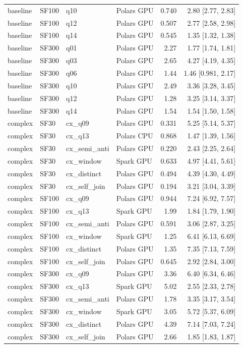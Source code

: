 \begin{longtable}{llllrr}
baseline & SF100 & q10 & Polars GPU & 0.740 & 2.80 [2.77, 2.83] \\
baseline & SF100 & q12 & Polars GPU & 0.507 & 2.77 [2.58, 2.98] \\
baseline & SF100 & q14 & Polars GPU & 0.545 & 1.35 [1.32, 1.38] \\
baseline & SF300 & q01 & Polars GPU & 2.27 & 1.77 [1.74, 1.81] \\
baseline & SF300 & q03 & Polars GPU & 2.65 & 4.27 [4.19, 4.35] \\
baseline & SF300 & q06 & Polars GPU & 1.44 & 1.46 [0.981, 2.17] \\
baseline & SF300 & q10 & Polars GPU & 2.49 & 3.36 [3.28, 3.45] \\
baseline & SF300 & q12 & Polars GPU & 1.28 & 3.25 [3.14, 3.37] \\
baseline & SF300 & q14 & Polars GPU & 1.54 & 1.54 [1.50, 1.58] \\
complex & SF30 & cx\_q09 & Polars GPU & 0.331 & 5.25 [5.14, 5.37] \\
complex & SF30 & cx\_q13 & Polars CPU & 0.868 & 1.47 [1.39, 1.56] \\
complex & SF30 & cx\_semi\_anti & Polars GPU & 0.220 & 2.43 [2.25, 2.64] \\
complex & SF30 & cx\_window & Spark GPU & 0.633 & 4.97 [4.41, 5.61] \\
complex & SF30 & cx\_distinct & Polars GPU & 0.494 & 4.39 [4.30, 4.49] \\
complex & SF30 & cx\_self\_join & Polars GPU & 0.194 & 3.21 [3.04, 3.39] \\
complex & SF100 & cx\_q09 & Polars GPU & 0.944 & 7.24 [6.92, 7.57] \\
complex & SF100 & cx\_q13 & Spark GPU & 1.99 & 1.84 [1.79, 1.90] \\
complex & SF100 & cx\_semi\_anti & Polars GPU & 0.591 & 3.06 [2.87, 3.25] \\
complex & SF100 & cx\_window & Spark GPU & 1.25 & 6.41 [6.13, 6.69] \\
complex & SF100 & cx\_distinct & Polars GPU & 1.35 & 7.35 [7.13, 7.59] \\
complex & SF100 & cx\_self\_join & Polars GPU & 0.645 & 2.92 [2.84, 3.00] \\
complex & SF300 & cx\_q09 & Polars GPU & 3.36 & 6.40 [6.34, 6.46] \\
complex & SF300 & cx\_q13 & Spark GPU & 5.02 & 2.55 [2.33, 2.78] \\
complex & SF300 & cx\_semi\_anti & Polars GPU & 1.78 & 3.35 [3.17, 3.54] \\
complex & SF300 & cx\_window & Spark GPU & 3.05 & 5.72 [5.37, 6.09] \\
complex & SF300 & cx\_distinct & Polars GPU & 4.39 & 7.14 [7.03, 7.24] \\
complex & SF300 & cx\_self\_join & Polars GPU & 2.66 & 1.85 [1.83, 1.87] \\
\end{longtable}
